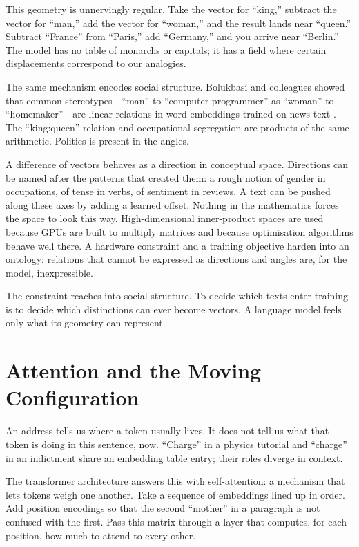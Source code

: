 \documentclass[12pt,a4paper]{article}
\begin{document}
This geometry is unnervingly regular. Take the vector for ``king,'' subtract the vector for ``man,'' add the vector for ``woman,'' and the result lands near ``queen.'' Subtract ``France'' from ``Paris,'' add ``Germany,'' and you arrive near ``Berlin.'' The model has no table of monarchs or capitals; it has a field where certain displacements correspond to our analogies.

The same mechanism encodes social structure. Bolukbasi and colleagues showed that common stereotypes---``man'' to ``computer programmer'' as ``woman'' to ``homemaker''---are linear relations in word embeddings trained on news text \cite{bolukbasi2016man}. The ``king:queen'' relation and occupational segregation are products of the same arithmetic. Politics is present in the angles.

A difference of vectors behaves as a direction in conceptual space. Directions can be named after the patterns that created them: a rough notion of gender in occupations, of tense in verbs, of sentiment in reviews. A text can be pushed along these axes by adding a learned offset. Nothing in the mathematics forces the space to look this way. High-dimensional inner-product spaces are used because GPUs are built to multiply matrices and because optimisation algorithms behave well there. A hardware constraint and a training objective harden into an ontology: relations that cannot be expressed as directions and angles are, for the model, inexpressible.

The constraint reaches into social structure. To decide which texts enter training is to decide which distinctions can ever become vectors. A language model feels only what its geometry can represent.

\section{Attention and the Moving Configuration}

An address tells us where a token usually lives. It does not tell us what that token is doing in this sentence, now. ``Charge'' in a physics tutorial and ``charge'' in an indictment share an embedding table entry; their roles diverge in context.

The transformer architecture answers this with self-attention: a mechanism that lets tokens weigh one another. Take a sequence of embeddings lined up in order. Add position encodings so that the second ``mother'' in a paragraph is not confused with the first. Pass this matrix through a layer that computes, for each position, how much to attend to every other.
\end{document}
